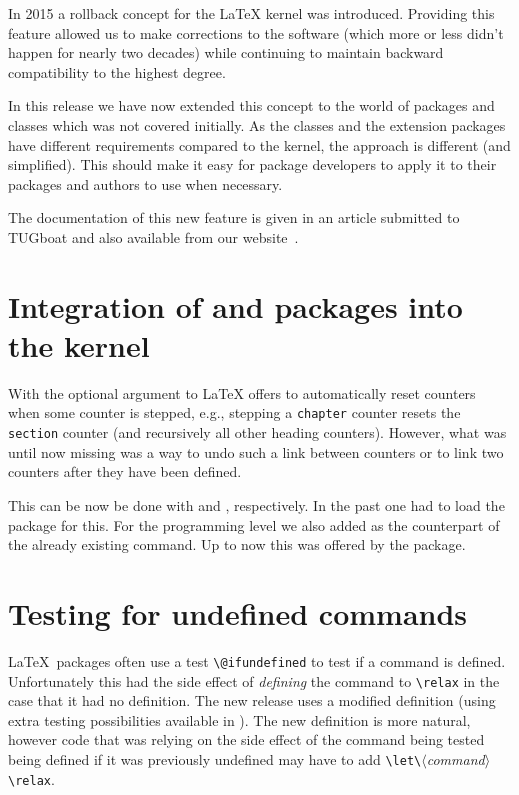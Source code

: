 \documentclass{ltnews}
\providecommand\meta[1]{$\langle$\textit{#1}$\rangle$}
\begin{document}
  In 2015 a rollback concept for the \LaTeX{} kernel was introduced.
  Providing this feature allowed us to make corrections to the
  software (which more or less didn't happen for nearly two decades)
  while continuing to maintain backward compatibility to the highest
  degree.

  In this release we have now extended this concept to
  the world of packages and classes which was not covered
  initially. As the classes and the extension packages have different
  requirements compared to the kernel, the approach is different (and
  simplified). This should make it easy for package developers to
  apply it to their packages and authors to use when necessary.

  The documentation of this new feature is given in an article
  submitted to TUGboat and also available from our
  website~\cite{Mittelbach:TB39-2}.


\section[Integration of \pkg{remreset} and \pkg{chngcntr} packages]
         {Integration of  and  packages
         into the kernel}

With the optional argument to  \LaTeX{} offers to
automatically reset counters when some counter is stepped, e.g.,
stepping a \texttt{chapter} counter resets the \texttt{section}
counter (and recursively all other heading counters). However, what
was until now missing was a way to undo such a link between counters
or to link two counters after they have been defined.

This can be now be done with  and ,
respectively. In the past one had to load the  package
for this. For the programming level we also added
 as the counterpart of the already existing
 command. Up to now this was offered by the
 package.

\section{Testing for undefined commands}
\LaTeX\ packages often use a test \verb|\@ifundefined| to test if a command
is defined. Unfortunately this had the side effect of \emph{defining}
the command to \verb|\relax| in the case that it had no definition.
 The new release uses a modified definition
(using extra testing possibilities available in ). The new definition
is more natural, however code that was relying on the side effect of the
command being tested being defined if it was previously undefined may have to add
\verb|\let\|\meta{command}\verb|\relax|.
\end{document}
